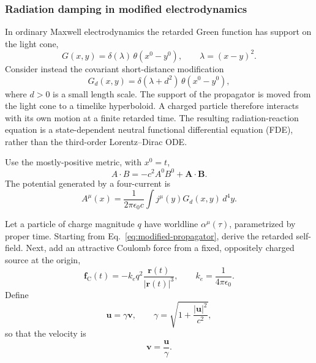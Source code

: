 \subsubsection{Radiation damping in modified electrodynamics}
\label{problem:radiation-damping}
In ordinary Maxwell electrodynamics the retarded Green function has support on
the light cone,
\begin{equation}
  G(x,y)=\delta(\lambda)\,\theta(x^0-y^0),
  \qquad \lambda=(x-y)^2.
\end{equation}
Consider instead the covariant short-distance modification
\begin{equation}
  G_d(x,y)=\delta(\lambda+d^2)\,\theta(x^0-y^0),
  \label{eq:modified-propagator}
\end{equation}
where $d>0$ is a small length scale.  The support of the propagator is moved
from the light cone to a timelike hyperboloid.  A charged particle therefore
interacts with its own motion at a finite retarded time.  The resulting
radiation-reaction equation is a state-dependent neutral functional
differential equation (FDE), rather than the third-order Lorentz--Dirac ODE.

Use the mostly-positive metric, with $x^0=t$,
\begin{equation}
  A\mathbin{\cdot}B=-c^2 A^0B^0+\bm A\mathbin{\cdot}\bm B.
  \label{eq:metric}
\end{equation}
The potential generated by a four-current is
\begin{equation}
  A^\mu(x)=\frac{1}{2\pi\epsilon_0c}
  \int j^\mu(y)G_d(x,y)\,d^4y.
\end{equation}


Let a particle of charge magnitude $q$ have worldline $\alpha^\mu(\tau)$,
parametrized by proper time.  Starting from Eq.~\eqref{eq:modified-propagator}, derive the retarded self-field.  Next, add an attractive Coulomb force from a fixed, oppositely charged source at the origin,
  \begin{equation}
    \bm f_{\mathrm C}(t)
    =-k_e q^2\frac{\bm r(t)}{|\bm r(t)|^3},
    \qquad k_e=\frac{1}{4\pi\epsilon_0}.
    \label{eq:coulomb-force}
  \end{equation}
Define
  \begin{equation}
    \bm u=\gamma\bm v,
    \qquad
    \gamma=\sqrt{1+\frac{|\bm u|^2}{c^2}},
\end{equation}
so that the velocity is
\begin{equation}
    \bm v=\frac{\bm u}{\gamma}.
  \end{equation}

